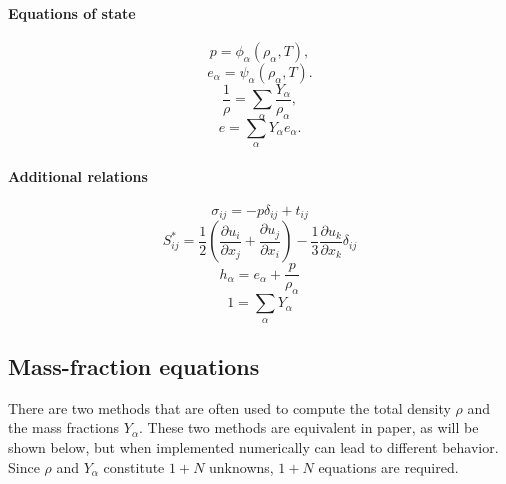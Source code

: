 \documentclass[oneside,a4paper,11pt]{report}
\begin{document}
\paragraph{Equations of state}

\begin{equation*}
    p = \phi_\alpha (\rho_\alpha, T),
\end{equation*}
\begin{equation*}
    e_\alpha = \psi_\alpha (\rho_\alpha, T).
\end{equation*}
\begin{equation*}
    \frac{1}{\rho} = \sum_\alpha \frac{Y_\alpha}{\rho_\alpha},
\end{equation*}
\begin{equation*}
    e = \sum_\alpha Y_\alpha e_\alpha.
\end{equation*}

\paragraph{Additional relations}

\begin{equation*}
    \sigma_{ij} = -p \delta_{ij} + t_{ij}
\end{equation*}
\begin{equation*}
    S^*_{ij} = \frac{1}{2} \left ( \frac{\partial u_i}{\partial x_j} + \frac{\partial u_j}{\partial x_i} \right ) - \frac{1}{3} \frac{\partial u_k}{\partial x_k} \delta_{ij}
\end{equation*}
\begin{equation*}
    h_\alpha = e_\alpha + \frac{p}{\rho_\alpha}
\end{equation*}
\begin{equation*}
    1 = \sum_\alpha Y_\alpha 
\end{equation*}

\subsection{Mass-fraction equations}
\label{sec:mass_frac_methods}
There are two methods that are often used to compute the total density $\rho$ and the mass fractions $Y_\alpha$. These two methods are equivalent in paper, as will be shown below, but when implemented numerically can lead to different behavior. Since $\rho$ and $Y_\alpha$ constitute $1+N$ unknowns, $1+N$ equations are required.
\end{document}
